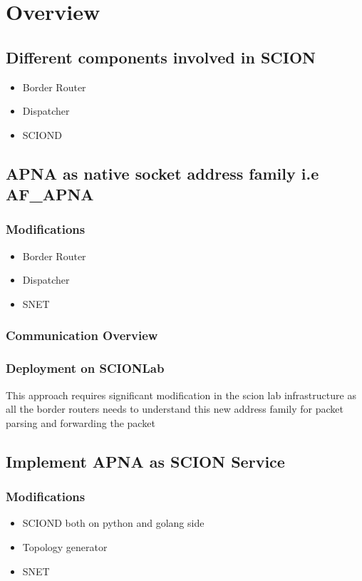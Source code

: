 
\chapter{Overview} %

\label{overview} %

\section{Different components involved in SCION}
\begin{itemize}
\item Border Router
\item Dispatcher
\item SCIOND
\end{itemize}

\section{APNA as native socket address family i.e AF\_APNA}
\subsection{Modifications}
\begin{itemize}
	\item Border Router
    \item Dispatcher
    \item SNET
\end{itemize}

\subsection{Communication Overview}

\subsection{Deployment on SCIONLab}
This approach requires significant modification in the scion lab infrastructure as all the border routers needs to understand this new address family for packet parsing and forwarding the packet

\section{Implement APNA as SCION Service}
\subsection{Modifications}
\begin{itemize}
	\item SCIOND both on python and golang side
    \item Topology generator
    \item SNET
\end{itemize}

